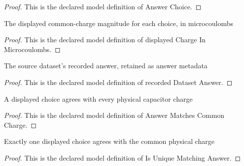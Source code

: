 \begin{proof}
  This is the declared model definition of Answer Choice.
\end{proof}
\begin{definition}
  \label{def:physics:phyx-mini-0879:phyxminiproblems-problemphyxmini0879-answerchoice-displayedchargeinmicrocoulombs}
  The displayed common-charge magnitude for each choice, in microcoulombs
\end{definition}
\begin{proof}
  This is the declared model definition of displayed Charge In Microcoulombs.
\end{proof}
\begin{definition}
  \label{def:physics:phyx-mini-0879:phyxminiproblems-problemphyxmini0879-recordeddatasetanswer}
  The source dataset's recorded answer, retained as answer metadata
\end{definition}
\begin{proof}
  This is the declared model definition of recorded Dataset Answer.
\end{proof}
\begin{definition}
  \label{def:physics:phyx-mini-0879:phyxminiproblems-problemphyxmini0879-answermatchescommoncharge}
  A displayed choice agrees with every physical capacitor charge
\end{definition}
\begin{proof}
  This is the declared model definition of Answer Matches Common Charge.
\end{proof}
\begin{definition}
  \label{def:physics:phyx-mini-0879:phyxminiproblems-problemphyxmini0879-isuniquematchinganswer}
  Exactly one displayed choice agrees with the common physical charge
\end{definition}
\begin{proof}
  This is the declared model definition of Is Unique Matching Answer.
\end{proof}
